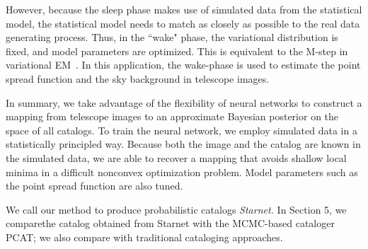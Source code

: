 However, because the sleep phase makes use of simulated data from the statistical model, the statistical model needs to match as closely as possible to the real data generating process. 
Thus, in the ``wake" phase, the variational distribution is fixed, and model parameters are optimized. 
This is equivalent to the M-step in variational EM~\cite{Jordan_intro_vi, neal2000varem, Beal2002varem}.
In this application, the wake-phase is used to estimate the point spread function and the sky background in telescope images. 

In summary, we take advantage of the flexibility of neural networks to construct a mapping from telescope images to an approximate Bayesian posterior on the space of all catalogs. To train the neural network, we employ simulated data in a statistically principled way. 
Because both the image and the catalog are known in the simulated data, we are able to recover a mapping that avoids shallow local minima in a difficult nonconvex optimization problem. 
Model parameters such as the point spread function are also tuned. 

We call our method to produce probabilistic catalogs {\itshape Starnet.}
In Section 5, we comparethe catalog obtained from Starnet with the MCMC-based cataloger PCAT;
we also compare with traditional cataloging approaches.



















